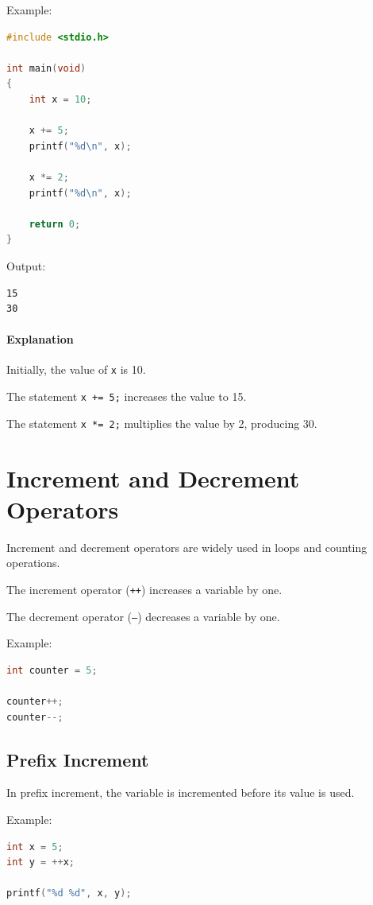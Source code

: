 \documentclass[12pt,openany]{book}
\begin{document}
Example:

\begin{lstlisting}[language=C]
#include <stdio.h>

int main(void)
{
    int x = 10;

    x += 5;
    printf("%d\n", x);

    x *= 2;
    printf("%d\n", x);

    return 0;
}
\end{lstlisting}

Output:

\begin{lstlisting}
15
30
\end{lstlisting}

\paragraph{Explanation}

Initially, the value of \texttt{x} is 10.

The statement \texttt{x += 5;} increases the value to 15.

The statement \texttt{x *= 2;} multiplies the value by 2, producing 30.

\section{Increment and Decrement Operators}

Increment and decrement operators are widely used in loops and counting operations.

The increment operator (\texttt{++}) increases a variable by one.

The decrement operator (\texttt{--}) decreases a variable by one.

Example:

\begin{lstlisting}[language=C]
int counter = 5;

counter++;
counter--;
\end{lstlisting}

\subsection{Prefix Increment}

In prefix increment, the variable is incremented before its value is used.

Example:

\begin{lstlisting}[language=C]
int x = 5;
int y = ++x;

printf("%d %d", x, y);
\end{lstlisting}
\end{document}
